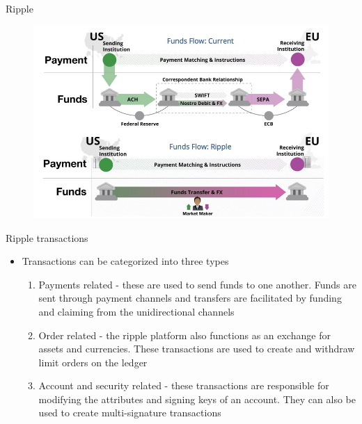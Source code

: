 \documentclass[11pt]{beamer}
\begin{document}

\begin{frame}{Ripple}
	\begin{figure}[]
		\centering
		\includegraphics  [scale=0.3]{Images/ripple}
	\end{figure}
\end{frame}


\begin{frame}{Ripple transactions}
	\begin{itemize}
		\item Transactions can be categorized into three types
		\begin{enumerate}
			\item Payments related - these are used to send funds to one another. Funds are sent through payment channels and transfers are facilitated by funding and claiming from the unidirectional channels
			\item Order related - the ripple platform also functions as an exchange for assets and currencies. These transactions are used to create and withdraw limit orders on the ledger
			\item Account and security related - these transactions are responsible for modifying the attributes and signing keys of an account. They can also be used to create multi-signature transactions
		\end{enumerate}
	\end{itemize}
\end{frame}

\end{document}
